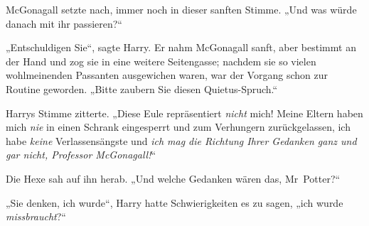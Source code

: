 McGonagall setzte nach, immer noch in dieser sanften Stimme.
„Und was würde danach mit ihr passieren?“

„Entschuldigen Sie“, sagte Harry. Er nahm McGonagall sanft, aber bestimmt an der Hand und zog sie in eine weitere Seitengasse; nachdem sie so vielen wohlmeinenden Passanten ausgewichen waren, war der Vorgang schon zur Routine geworden.
„Bitte zaubern Sie diesen Quietus-Spruch.“


Harrys Stimme zitterte.
„Diese Eule repräsentiert \emph{nicht} mich! Meine Eltern haben mich \emph{nie} in einen Schrank eingesperrt und zum Verhungern zurückgelassen, ich habe \emph{keine} Verlassensängste und \emph{ich mag die Richtung Ihrer Gedanken ganz und gar nicht, Professor McGonagall!}“

Die Hexe sah auf ihn herab.
„Und welche Gedanken wären das, Mr~Potter?“

„Sie denken, ich wurde“, Harry hatte Schwierigkeiten es zu sagen, „ich wurde \emph{missbraucht}?“

